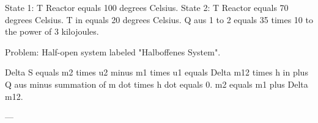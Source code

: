 State 1: T Reactor equals 100 degrees Celsius.  
State 2: T Reactor equals 70 degrees Celsius.  
T in equals 20 degrees Celsius.  
Q aus 1 to 2 equals 35 times 10 to the power of 3 kilojoules.  

Problem: Half-open system labeled "Halboffenes System".  

Delta S equals m2 times u2 minus m1 times u1 equals Delta m12 times h in plus Q aus minus summation of m dot times h dot equals 0.  
m2 equals m1 plus Delta m12.  

---